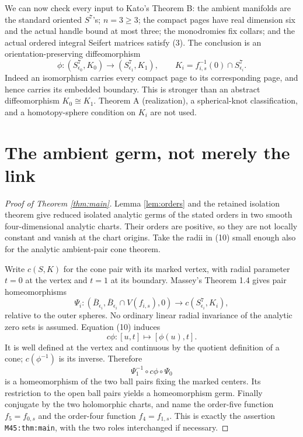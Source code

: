 \documentclass[11pt]{article}
\begin{document}
We can now check every input to Kato's Theorem B: the ambient
manifolds are the standard oriented \(S^7\)'s; \(n=3\geq3\);
the compact pages have real dimension six and the actual handle
bound at most three; the monodromies fix collars; and the actual
ordered integral Seifert matrices satisfy (3).
The conclusion is an orientation-preserving diffeomorphism
\[
\phi:(S^7_{\epsilon_0},K_0)\longrightarrow
      (S^7_{\epsilon_1},K_1),\qquad
K_i=f_{i,s}^{-1}(0)\cap S^7_{\epsilon_i}.                          \tag{10}
\]
Indeed an isomorphism carries every compact page to its
corresponding page, and hence carries its embedded boundary.
This is stronger than an abstract diffeomorphism \(K_0\cong K_1\).
Theorem A (realization), a spherical-knot classification, and a
homotopy-sphere condition on \(K_i\) are not used.

\section{The ambient germ, not merely the link}

\begin{proof}[Proof of Theorem \ref{thm:main}]
Lemma \ref{lem:orders} and the retained isolation theorem give
reduced isolated analytic germs of the stated orders in two smooth
four-dimensional analytic charts. Their orders are positive, so
they are not locally constant and vanish at the chart origins.
Take the radii in (10) small enough also for the analytic
ambient-pair cone theorem.

Write \(c(S,K)\) for the cone pair with its marked vertex, with
radial parameter \(t=0\) at the vertex and \(t=1\) at its boundary.
Massey's Theorem 1.4 gives pair homeomorphisms
\[
\Psi_i:(\overline B_{\epsilon_i},
        \overline B_{\epsilon_i}\cap V(f_{i,s}),0)
       \longrightarrow c(S^7_{\epsilon_i},K_i),
\]
relative to the outer spheres. No ordinary linear radial
invariance of the analytic zero sets is assumed.
Equation (10) induces
\[
c\phi:[u,t]\longmapsto[\phi(u),t].
\]
It is well defined at the vertex and continuous by the quotient
definition of a cone; \(c(\phi^{-1})\) is its inverse. Therefore
\[
\Psi_1^{-1}\circ c\phi\circ\Psi_0
\]
is a homeomorphism of the two ball pairs fixing the marked centers.
Its restriction to the open ball pairs yields a homeomorphism
germ. Finally conjugate by the two holomorphic charts, and name
the order-five function \(f_5=f_{0,s}\) and the order-four function
\(f_4=f_{1,s}\). This is exactly the assertion
\texttt{M45:thm:main}, with the two roles interchanged if necessary.
\end{proof}
\end{document}
